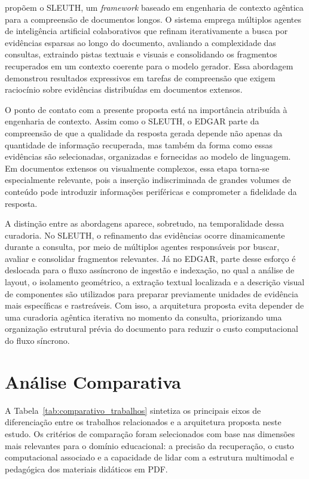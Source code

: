  propõem o SLEUTH, um \textit{framework} baseado em engenharia de contexto agêntica para a compreensão de documentos longos. O sistema emprega múltiplos agentes de inteligência artificial colaborativos que refinam iterativamente a busca por evidências esparsas ao longo do documento, avaliando a complexidade das consultas, extraindo pistas textuais e visuais e consolidando os fragmentos recuperados em um contexto coerente para o modelo gerador. Essa abordagem demonstrou resultados expressivos em tarefas de compreensão que exigem raciocínio sobre evidências distribuídas em documentos extensos.

O ponto de contato com a presente proposta está na importância atribuída à engenharia de contexto. Assim como o SLEUTH, o EDGAR parte da compreensão de que a qualidade da resposta gerada depende não apenas da quantidade de informação recuperada, mas também da forma como essas evidências são selecionadas, organizadas e fornecidas ao modelo de linguagem. Em documentos extensos ou visualmente complexos, essa etapa torna-se especialmente relevante, pois a inserção indiscriminada de grandes volumes de conteúdo pode introduzir informações periféricas e comprometer a fidelidade da resposta.

A distinção entre as abordagens aparece, sobretudo, na temporalidade dessa curadoria. No SLEUTH, o refinamento das evidências ocorre dinamicamente durante a consulta, por meio de múltiplos agentes responsáveis por buscar, avaliar e consolidar fragmentos relevantes. Já no EDGAR, parte desse esforço é deslocada para o fluxo assíncrono de ingestão e indexação, no qual a análise de layout, o isolamento geométrico, a extração textual localizada e a descrição visual de componentes são utilizados para preparar previamente unidades de evidência mais específicas e rastreáveis. Com isso, a arquitetura proposta evita depender de uma curadoria agêntica iterativa no momento da consulta, priorizando uma organização estrutural prévia do documento para reduzir o custo computacional do fluxo síncrono.

\section{Análise Comparativa}
\label{subsec:analise-comparativa}

A Tabela~\ref{tab:comparativo_trabalhos} sintetiza os principais eixos de diferenciação entre os trabalhos relacionados e a arquitetura proposta neste estudo. Os critérios de comparação foram selecionados com base nas dimensões mais relevantes para o domínio educacional: a precisão da recuperação, o custo computacional associado e a capacidade de lidar com a estrutura multimodal e pedagógica dos materiais didáticos em PDF.

